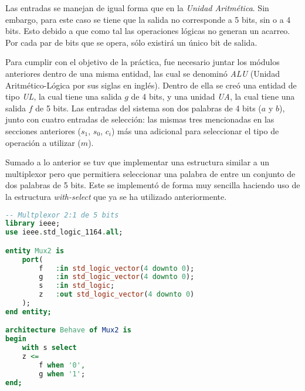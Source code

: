 \documentclass[../procedimientos.tex]{subfiles}
\begin{document}
Las entradas se manejan de igual forma que en la \textit{Unidad Aritmética}.  
Sin embargo, para este caso se tiene que la salida no corresponde a 5 bits, 
sin o a 4 bits. Esto debido a que como tal las operaciones lógicas no generan 
un acarreo. Por cada par de bits que se opera, sólo existirá un único bit de 
salida.

Para cumplir con el objetivo de la práctica, fue necesario juntar los módulos 
anteriores dentro de una misma entidad, las cual se denominó \textit{ALU} 
(Unidad Aritmético-Lógica por sus siglas en inglés). Dentro de ella se creó 
una entidad de tipo \textit{UL}, la cual tiene una salida $g$ de 4 bits, y una 
unidad \textit{UA}, la cual tiene una salida $f$ de 5 bits. Las entradas del 
sistema son dos palabras de 4 bits ($a$ y $b$), junto con cuatro entradas de 
selección: las mismas tres mencionadas en las secciones anteriores ($s_1$, 
$s_0$, $c_i$) más una adicional para seleccionar el tipo de operación a 
utilizar ($m$).

Sumado a lo anterior se tuv que implementar una estructura similar a un 
multiplexor pero que permitiera seleccionar una palabra de entre un conjunto 
de dos palabras de 5 bits. Este se implementó de forma muy sencilla haciendo 
uso de la estructura \textit{with-select} que ya se ha utilizado 
anteriormente.
\begin{lstlisting}[language=VHDL]
-- Multplexor 2:1 de 5 bits
library ieee;
use ieee.std_logic_1164.all;

entity Mux2 is
	port(
		f	:in std_logic_vector(4 downto 0);
		g	:in std_logic_vector(4 downto 0);
		s	:in std_logic;
		z	:out std_logic_vector(4 downto 0)
	);
end entity;

architecture Behave of Mux2 is
begin
	with s select
	z <=
		f when '0',
		g when '1';
end;
\end{lstlisting}
\end{document}
